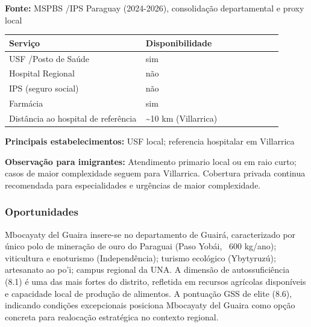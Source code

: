 \textbf{Fonte:} MSPBS /\allowbreak  IPS Paraguay (2024-2026), consolidação
departamental e proxy local

{\def\LTcaptype{none} %
\begin{longtable}{@{}>{\raggedright\arraybackslash}p{0.45\linewidth} >{\raggedright\arraybackslash}p{0.45\linewidth}@{}}
\toprule\noalign{}
Serviço & Disponibilidade \\
\midrule\noalign{}
\endhead
\bottomrule\noalign{}
\endlastfoot
USF /\allowbreak  Posto de Saúde & sim \\
Hospital Regional & não \\
IPS (seguro social) & não \\
Farmácia & sim \\
Distância ao hospital de referência & \textasciitilde10 km
(Villarrica) \\
\end{longtable}
}

\textbf{Principais estabelecimentos:} USF local; referencia hospitalar
em Villarrica

\textbf{Observação para imigrantes:} Atendimento primario local ou em
raio curto; casos de maior complexidade seguem para Villarrica.
Cobertura privada continua recomendada para especialidades e urgências
de maior complexidade.
\newpage

\subsubsection*{Oportunidades}\label{oport-mbocayaty-del-guaira-0407}
Mbocayaty del Guaira insere-se no departamento de Guairá, caracterizado por único polo de mineração de ouro do Paraguai (Paso Yobái, ~600 kg/ano); viticultura e enoturismo (Independência); turismo ecológico (Ybytyruzú); artesanato ao po'i; campus regional da UNA. A dimensão de autossuficiência (8.1) é uma das mais fortes do distrito, refletida em recursos agrícolas disponíveis e capacidade local de produção de alimentos. A pontuação GSS de elite (8.6), indicando condições excepcionais posiciona Mbocayaty del Guaira como opção concreta para realocação estratégica no contexto regional.

